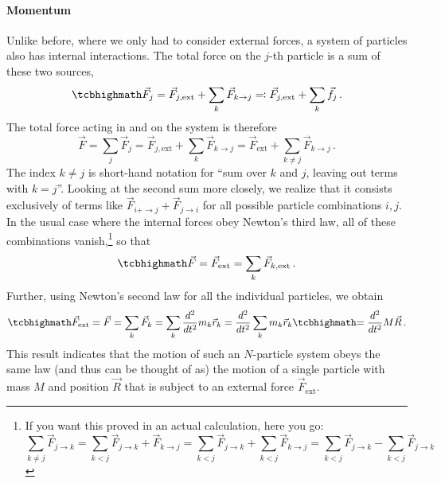 \documentclass[../class_mech_main.tex]{subfiles}
\begin{document}
			\paragraph{Momentum}
Unlike before, where we only had to consider external forces, a system of particles also has internal interactions. The total force on the $j$-th particle is a sum of these two sources,
\begin{equation}
	\eqbox{
		\vec{F}_j = \vec{F}_{j, \mathrm{ext}} + \sum_k \vec{F}_{k \rightarrow j} \eqqcolon \vec{F}_{j, \mathrm{ext}} + \sum_k \vec{f}_j
	} \, .
\end{equation}
The total force acting in and on the system is therefore
\begin{equation}
	\vec{F} = \sum_j \vec{F}_j = \vec{F}_{j, \mathrm{ext}} + \sum_k \vec{F}_{k \rightarrow j} = \vec{F}_\mathrm{ext} + \sum_{k \neq j} \vec{F}_{k \rightarrow j} \, .
\end{equation}
The index $k \neq j$ is short-hand notation for \enquote{sum over $k$ and $j$, leaving out terms with $k = j$}. Looking at the second sum more closely, we realize that it consists exclusively of terms like $\vec{F}_{i + \rightarrow j} + \vec{F}_{j \rightarrow i}$ for all possible particle combinations $i, j$. In the usual case where the internal forces obey Newton's third law, all of these combinations vanish,\footnote{If you want this proved in an actual calculation, here you go:
\begin{equation}
	\sum_{k \neq j} \vec{F}_{j \rightarrow k} = \sum_{k < j} \vec{F}_{j \rightarrow k} + \vec{F}_{k \rightarrow j} = \sum_{k < j} \vec{F}_{j \rightarrow k} + \sum_{k < j} \vec{F}_{k \rightarrow j} = \sum_{k < j} \vec{F}_{j \rightarrow k} - \sum_{k < j} \vec{F}_{j \rightarrow k}
\end{equation}%
} so that
\begin{equation}
	\eqbox{
		\vec{F} = \vec{F}_\mathrm{ext} = \sum_k \vec{F}_{k, \mathrm{ext}}
	} \, .
\end{equation}
Further, using Newton's second law for all the individual particles, we obtain
\begin{equation}
	\eqbox{
		\vec{F}_\mathrm{ext}
	} = \vec{F} = \sum_k \vec{F}_k = \sum_k \dv[2]{t} m_k \vec{r}_k = \dv[2]{t} \sum_k m_k \vec{r}_k
	\eqbox{
		= \dv[2]{t} M \vec{R}
	} \, .
\end{equation}
This result indicates that the motion of such an $N$-particle system obeys the same law (and thus can be thought of as) the motion of a single particle with mass $M$ and position $\vec{R}$ that is subject to an external force $\vec{F}_\mathrm{ext}$.
\end{document}
